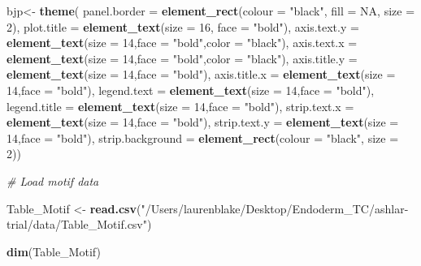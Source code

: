 \documentclass[]{article}
\newenvironment{Shaded}{\begin{snugshade}}{\end{snugshade}}
\newcommand{\KeywordTok}[1]{\textcolor[rgb]{0.13,0.29,0.53}{\textbf{#1}}}
\newcommand{\DataTypeTok}[1]{\textcolor[rgb]{0.13,0.29,0.53}{#1}}
\newcommand{\DecValTok}[1]{\textcolor[rgb]{0.00,0.00,0.81}{#1}}
\newcommand{\StringTok}[1]{\textcolor[rgb]{0.31,0.60,0.02}{#1}}
\newcommand{\CommentTok}[1]{\textcolor[rgb]{0.56,0.35,0.01}{\textit{#1}}}
\newcommand{\OtherTok}[1]{\textcolor[rgb]{0.56,0.35,0.01}{#1}}
\newcommand{\NormalTok}[1]{#1}
\begin{document}
\begin{Shaded}
\begin{Highlighting}[]
\NormalTok{bjp<-}
\KeywordTok{theme}\NormalTok{(}
  \DataTypeTok{panel.border =} \KeywordTok{element_rect}\NormalTok{(}\DataTypeTok{colour =} \StringTok{"black"}\NormalTok{, }\DataTypeTok{fill =} \OtherTok{NA}\NormalTok{, }\DataTypeTok{size =} \DecValTok{2}\NormalTok{),}
  \DataTypeTok{plot.title =} \KeywordTok{element_text}\NormalTok{(}\DataTypeTok{size =} \DecValTok{16}\NormalTok{, }\DataTypeTok{face =} \StringTok{"bold"}\NormalTok{),}
  \DataTypeTok{axis.text.y =}  \KeywordTok{element_text}\NormalTok{(}\DataTypeTok{size =} \DecValTok{14}\NormalTok{,}\DataTypeTok{face =} \StringTok{"bold"}\NormalTok{,}\DataTypeTok{color =} \StringTok{"black"}\NormalTok{),}
  \DataTypeTok{axis.text.x =}  \KeywordTok{element_text}\NormalTok{(}\DataTypeTok{size =} \DecValTok{14}\NormalTok{,}\DataTypeTok{face =} \StringTok{"bold"}\NormalTok{,}\DataTypeTok{color =} \StringTok{"black"}\NormalTok{),}
  \DataTypeTok{axis.title.y =} \KeywordTok{element_text}\NormalTok{(}\DataTypeTok{size =} \DecValTok{14}\NormalTok{,}\DataTypeTok{face =} \StringTok{"bold"}\NormalTok{),}
  \DataTypeTok{axis.title.x =} \KeywordTok{element_text}\NormalTok{(}\DataTypeTok{size =} \DecValTok{14}\NormalTok{,}\DataTypeTok{face =} \StringTok{"bold"}\NormalTok{),}
  \DataTypeTok{legend.text =} \KeywordTok{element_text}\NormalTok{(}\DataTypeTok{size =} \DecValTok{14}\NormalTok{,}\DataTypeTok{face =} \StringTok{"bold"}\NormalTok{),}
  \DataTypeTok{legend.title =} \KeywordTok{element_text}\NormalTok{(}\DataTypeTok{size =} \DecValTok{14}\NormalTok{,}\DataTypeTok{face =} \StringTok{"bold"}\NormalTok{),}
  \DataTypeTok{strip.text.x =} \KeywordTok{element_text}\NormalTok{(}\DataTypeTok{size =} \DecValTok{14}\NormalTok{,}\DataTypeTok{face =} \StringTok{"bold"}\NormalTok{),}
  \DataTypeTok{strip.text.y =} \KeywordTok{element_text}\NormalTok{(}\DataTypeTok{size =} \DecValTok{14}\NormalTok{,}\DataTypeTok{face =} \StringTok{"bold"}\NormalTok{),}
  \DataTypeTok{strip.background =} \KeywordTok{element_rect}\NormalTok{(}\DataTypeTok{colour =} \StringTok{"black"}\NormalTok{, }\DataTypeTok{size =} \DecValTok{2}\NormalTok{))}


\CommentTok{# Load motif data}

\NormalTok{Table_Motif <-}\StringTok{ }\KeywordTok{read.csv}\NormalTok{(}\StringTok{"/Users/laurenblake/Desktop/Endoderm_TC/ashlar-trial/data/Table_Motif.csv"}\NormalTok{)}

\KeywordTok{dim}\NormalTok{(Table_Motif)}
\end{Highlighting}
\end{Shaded}
\end{document}
